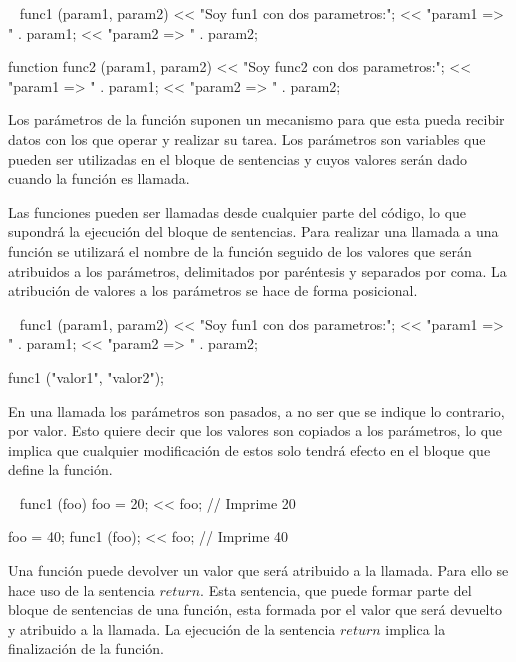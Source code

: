 \begin{myverbatim}
   ~ func1 (param1, param2) { 
      << "Soy fun1 con dos parametros:";
      << "param1 => " . param1;
      << "param2 => " . param2;
   }
   
   function func2 (param1, param2) { 
      << "Soy func2 con dos parametros:";
      << "param1 => " . param1;
      << "param2 => " . param2;
   }
\end{myverbatim}

Los parámetros de la función suponen un mecanismo para que esta pueda recibir datos con los que operar
y realizar su tarea. Los parámetros son variables que pueden ser utilizadas en el bloque de sentencias
y cuyos valores serán dado cuando la función es llamada.

Las funciones pueden ser llamadas desde cualquier parte del código, lo que supondrá la ejecución del bloque
de sentencias. Para realizar una llamada a una función se utilizará el nombre de la función seguido de los 
valores que serán atribuidos a los parámetros, delimitados por paréntesis y separados por coma. La atribución
de valores a los parámetros se hace de forma posicional. \\

\begin{myverbatim}
   ~ func1 (param1, param2) { 
      << "Soy fun1 con dos parametros:";
      << "param1 => " . param1;
      << "param2 => " . param2;
   }
   
   func1 ("valor1", "valor2");
\end{myverbatim}

En una llamada los parámetros son pasados, a no ser que se indique lo contrario, por valor. Esto quiere decir 
que los valores son copiados a los parámetros, lo que implica que cualquier modificación de estos solo tendrá efecto en el bloque 
que define la función. \\


\begin{myverbatim}
   ~ func1 (foo) { 
      foo = 20;
      << foo;  // Imprime 20
   }
   
   foo = 40;
   func1 (foo);
   << foo; // Imprime 40
\end{myverbatim}


Una función puede devolver un valor que será atribuido a la llamada. Para ello 
se hace uso de la sentencia $return$. Esta sentencia, que puede formar parte del
bloque de sentencias de una función, esta formada por el valor que será devuelto 
y atribuido a la llamada. La ejecución de la sentencia $return$ implica 
la finalización de la función.

